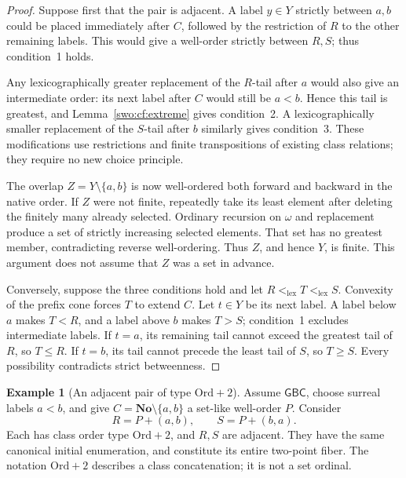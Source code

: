 \documentclass[11pt]{article}
\theoremstyle{definition}
\newtheorem{example}[example]{Example}
\theoremstyle{remark}
\newcommand{\No}{\mathbf{No}}
\newcommand{\Ord}{\mathrm{Ord}}
\newcommand{\lex}{\mathrm{lex}}
\newcommand{\GBC}{\mathsf{GBC}}
\begin{document}
\begin{proof}
Suppose first that the pair is adjacent.  A label \(y\in Y\) strictly
between \(a,b\) could be placed immediately after \(C\), followed by
the restriction of \(R\) to the other remaining labels.  This would
give a well-order strictly between \(R,S\); thus condition~1 holds.

Any lexicographically greater replacement of the \(R\)-tail after
\(a\) would also give an intermediate order: its next label after
\(C\) would still be \(a<b\).  Hence this tail is greatest, and
Lemma~\ref{swo:cf:extreme} gives condition~2.  A lexicographically smaller
replacement of the \(S\)-tail after \(b\) similarly gives
condition~3.  These modifications use restrictions and finite
transpositions of existing class relations; they require no new choice
principle.

The overlap \(Z=Y\setminus\{a,b\}\) is now well-ordered both forward
and backward in the native order.  If \(Z\) were not finite, repeatedly
take its least element after deleting the finitely many already selected.
Ordinary recursion on \(\omega\) and replacement produce a set of
strictly increasing selected elements.  That set has no greatest member,
contradicting reverse well-ordering.  Thus \(Z\), and hence \(Y\),
is finite.  This argument does not assume that \(Z\) was a set in
advance.

Conversely, suppose the three conditions hold and let
\(R<_{\lex}T<_{\lex}S\).  Convexity of the prefix cone forces \(T\)
to extend \(C\).  Let \(t\in Y\) be its next label.  A label below
\(a\) makes \(T<R\), and a label above \(b\) makes \(T>S\);
condition~1 excludes intermediate labels.  If \(t=a\), its remaining
tail cannot exceed the greatest tail of \(R\), so \(T\leq R\).
If \(t=b\), its tail cannot precede the least tail of \(S\), so
\(T\geq S\).  Every possibility contradicts strict betweenness.
\end{proof}

\begin{example}[An adjacent pair of type \(\Ord+2\)]
\label{swo:cf:ordtwo}
Assume \(\GBC\), choose surreal labels \(a<b\), and give
\(C=\No\setminus\{a,b\}\) a set-like well-order \(P\).  Consider
\[
 R=P+(a,b),\qquad S=P+(b,a).
\]
Each has class order type \(\Ord+2\), and \(R,S\) are adjacent.
They have the same canonical initial enumeration, and constitute its
entire two-point fiber.  The notation \(\Ord+2\) describes a class
concatenation; it is not a set ordinal.
\end{example}
\end{document}
